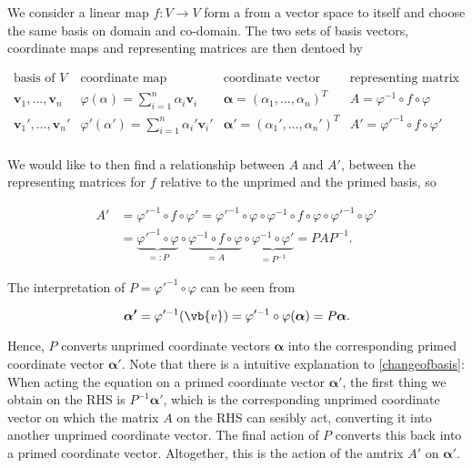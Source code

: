 \documentclass[a4paper,12pt]{report}
\begin{document}
We consider a linear map \(f:V \rightarrow V\) form a from a vector space to itself and choose the same basis on domain and  co-domain. The two sets of basis vectors, coordinate maps and representing matrices are then dentoed by

\begin{equation}
\begin{array}{cccc}
\text{basis of } V & \text{coordinate map} & \text{coordinate vector} & \text{representing matrix} \\[10pt]
\bm{v}_1, \ldots, \bm{v}_n & \varphi(\alpha) = \sum_{i=1}^n \alpha_i \bm{v}_i & \bm{\alpha} = (\alpha_1, \ldots, \alpha_n)^T & A = \varphi^{-1} \circ f \circ \varphi \\[15pt]
\bm{v}_1', \ldots, \bm{v}_n' & \varphi'(\alpha') = \sum_{i=1}^n \alpha_i' \bm{v}_i' & \bm{\alpha}' = (\alpha_1', \ldots, \alpha_n')^T & A' = \varphi'^{-1} \circ f \circ \varphi' \\[10pt]
\end{array}
\end{equation}

We would like to then find a relationship between \(A\) and \(A'\), \ie between the representing matrices for \(f\) relative to the unprimed and the primed basis, so

\begin{equation} \label{changeofbasis} 
    \begin{aligned}
        A' &= \varphi'^{-1} \circ f \circ \varphi' = \varphi'^{-1} \circ \varphi \circ \varphi^{-1} \circ f \circ \varphi \circ \varphi'^{-1} \circ \varphi' \\
           &= \underbrace{\varphi'^{-1} \circ \varphi}_{=: P} \circ \underbrace{\varphi^{-1} \circ f \circ \varphi}_{= A} \circ \underbrace{\varphi^{-1} \circ \varphi'}_{= P^{-1}} = P A P^{-1}.
    \end{aligned}
\end{equation}

The interpretation of \(P = \varphi '^{-1} \circ \varphi \) can be seen from 

\begin{equation}
    \boldsymbol{\alpha '} = \varphi '^{-1} (\vb{v} ) = \varphi '^{-1} \circ \varphi (\boldsymbol{\alpha } ) = P \boldsymbol{\alpha }.  
\end{equation}

Hence, \(P \) converts unprimed coordinate vectors \(\boldsymbol{\alpha } \) into the corresponding primed coordinate vector \(\boldsymbol{\alpha '} \). Note that there is a intuitive explanation to \cref{changeofbasis}: When acting the equation on  a primed coordinate vector \(\boldsymbol{\alpha '} \), the first thing we obtain on the RHS is \(P^{-1} \boldsymbol{\alpha '} \), which is the corresponding unprimed coordinate vector on which the matrix \(A\) on the RHS can sesibly act, converting it into another unprimed coordinate vector. The final action of \(P\) converts this back into a primed coordinate vector. Altogether, this is the action of the amtrix \(A'\) on \(\boldsymbol{\alpha '} \). 
\end{document}
